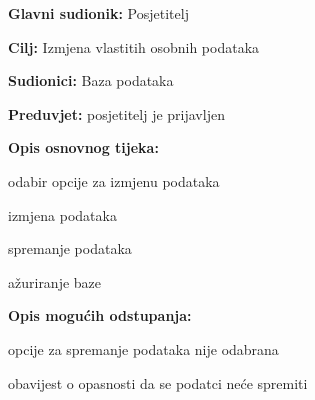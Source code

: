 					\noindent {}
					\begin{packed_item}
	
						\item \textbf{Glavni sudionik: }Posjetitelj
						\item  \textbf{Cilj:} Izmjena vlastitih osobnih podataka
						\item  \textbf{Sudionici:} Baza podataka
						\item  \textbf{Preduvjet:} posjetitelj je prijavljen
						\item  \textbf{Opis osnovnog tijeka:}
						
						\item[] \begin{packed_enum}
	
							\item odabir opcije za izmjenu podataka
							\item izmjena podataka
							\item spremanje podataka 
							\item ažuriranje baze
							
						\end{packed_enum}
						
						\item  \textbf{Opis mogućih odstupanja:}
						
						\item[] \begin{packed_item}
	
							\item[2.a] opcije za spremanje podataka nije odabrana
							\item[] \begin{packed_enum}
								
								\item obavijest o opasnosti da se podatci neće spremiti
								
							\end{packed_enum}
						
							
						\end{packed_item}
					\end{packed_item}
					
